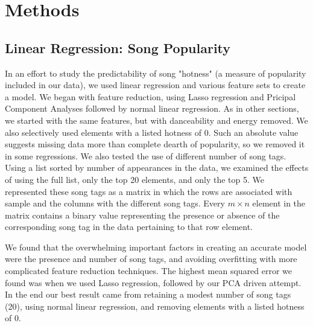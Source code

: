 \documentclass[12pt]{article}
\begin{document}
\section{Methods}
\label{sec:methods}

\subsection{Linear Regression: Song Popularity}
\label{subsec:linearRegression}
In an effort to study the predictability of song "hotness" (a measure of popularity included in our data), we used linear regression and various feature sets to create a model. We began with feature reduction, using Lasso regression and Pricipal Component Analyses followed by normal linear regression. As in other sections, we started with the same features, but with danceability and energy removed. We also selectively used elements with a listed hotness of 0. Such an absolute value suggests missing data more than complete dearth of popularity, so we removed it in some regressions. We also tested the use of different number of song tags. Using a list sorted by number of appearances in the data, we examined the effects of using the full list, only the top 20 elements, and only the top 5. We represented these song tags as a matrix in which the rows are associated with sample and the columns with the different song tags. Every $m \times n$ element in the matrix contains a binary value representing the presence or absence of the corresponding song tag in the data pertaining to that row element.

We found that the overwhelming important factors in creating an accurate model were the presence and number of song tags, and avoiding overfitting with more complicated feature reduction techniques. The highest mean squared error we found was when we used Lasso regression, followed by our PCA driven attempt. In the end our best result came from retaining a modest number of song tags (20), using normal linear regression, and removing elements with a listed hotness of 0.

\end{document}
